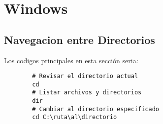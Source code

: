 \chapter{Windows}

\section{Navegacion entre Directorios}
    Los codigos principales en esta sección seria: 
    \begin{lstlisting}
        # Revisar el directorio actual
        cd
        # Listar archivos y directorios
        dir
        # Cambiar al directorio especificado
        cd C:\ruta\al\directorio        
    \end{lstlisting}
